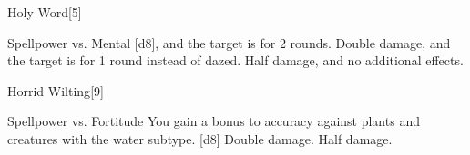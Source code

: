 \begin{spellsection}{Holy Word}[5]
    \begin{spellheader}
    \end{spellheader}
    \begin{spellcontent}
        \begin{spelltargetinginfo}
        \end{spelltargetinginfo}
        \begin{spelleffects}
            \begin{spellattack}{Spellpower vs. Mental}
                \spellsuccess {}[d8], and the target is \dazed for 2 rounds.
                \spellcritical Double damage, and the target is \stunned for 1 round instead of dazed.
                \spellfailure Half damage, and no additional effects.
            \end{spellattack}
        \end{spelleffects}
    \end{spellcontent}
    \begin{spellfooter}
        \miscastexplode
    \end{spellfooter}
    \begin{spellaugments}
    \end{spellaugments}
\end{spellsection}

\begin{spellsection}{Horrid Wilting}[9]
    \begin{spellheader}
    \end{spellheader}
    \begin{spellcontent}
        \begin{spelltargetinginfo}
        \end{spelltargetinginfo}
        \begin{spelleffects}
            \begin{spellattack}{Spellpower vs. Fortitude}
                \spellspecial You gain a  bonus to accuracy against plants and creatures with the water subtype.
                \spellsuccess {}[d8]
                \spellcritical Double damage.
                \spellfailure Half damage.
            \end{spellattack}
        \end{spelleffects}
    \end{spellcontent}
    \begin{spellfooter}
        \miscastyou
    \end{spellfooter}
\end{spellsection}

